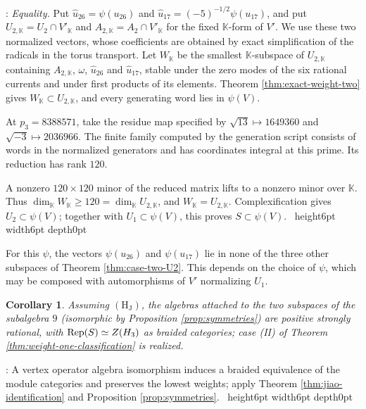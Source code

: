 \documentclass[leqno]{article}
\newcommand{\K}{\ensuremath{\mathbb{K}}}
\let\cal\relax
\newcommand{\cal}{\mathcal}
\renewcommand{\geq}{\ensuremath{\geqslant}}
\newcommand{\qed}{\hfill \vrule height6pt  width6pt depth0pt}
\DeclareMathOperator{\Rep}{Rep}
\newtheorem{cor}[thm]{Corollary}
\newenvironment{proof}[1][]{\noindent {\it Proof #1} : }{\hbox{~}\qed
\smallskip
}
\numberwithin{equation}{section}
\begin{document}
\begin{proof}
\emph{Equality.} Put $\widehat u_{26} = \psi(u_{26})$ and $\widehat u_{17} = (-5)^{-1/2}\psi(u_{17})$, and put $U_{2,\K} = U_2 \cap V'_\K$ and $A_{2,\K} = A_2 \cap V'_\K$ for the fixed $\K$-form of $V'$. We use these two normalized vectors, whose coefficients are obtained by exact simplification of the radicals in the torus transport. Let $W_\K$ be the smallest $\K$-subspace of $U_{2,\K}$ containing $A_{2,\K}$, $\omega$, $\widehat u_{26}$ and $\widehat u_{17}$, stable under the zero modes of the six rational currents and under first products of its elements. Theorem \ref{thm:exact-weight-two} gives $W_\K \subset U_{2,\K}$, and every generating word lies in $\psi(V)$.

At $p_3 = 8388571$, take the residue map specified by $\sqrt{13} \mapsto 1649360$ and $\sqrt{-3} \mapsto 2036966$. The finite family computed by the generation script consists of words in the normalized generators and has coordinates integral at this prime. Its reduction has rank $120$.

A nonzero $120 \times 120$ minor of the reduced matrix lifts to a nonzero minor over $\K$. Thus $\dim_\K W_\K \geq 120 = \dim_\K U_{2,\K}$, and $W_\K = U_{2,\K}$. Complexification gives $U_2 \subset \psi(V)$; together with $U_1 \subset \psi(V)$, this proves $S \subset \psi(V)$.
\end{proof}

For this $\psi$, the vectors $\psi(u_{26})$ and $\psi(u_{17})$ lie in none of the three other subspaces of Theorem \ref{thm:case-two-U2}. This depends on the choice of $\psi$, which may be composed with automorphisms of $V'$ normalizing $U_1$.%

\begin{cor}
\label{cor:case-two-realized}
Assuming $\mathrm{(H_J)}$, the algebras attached to the two subspaces of the subalgebra $9$ (isomorphic by Proposition \ref{prop:symmetries}) are positive strongly rational, with $\Rep(S) \simeq Z(\cal H_3)$ as braided categories; case (II) of Theorem \ref{thm:weight-one-classification} is realized.
\end{cor}

\begin{proof}
A vertex operator algebra isomorphism induces a braided equivalence of the module categories and preserves the lowest weights; apply Theorem \ref{thm:jiao-identification} and Proposition \ref{prop:symmetries}.
\end{proof}
\end{document}
